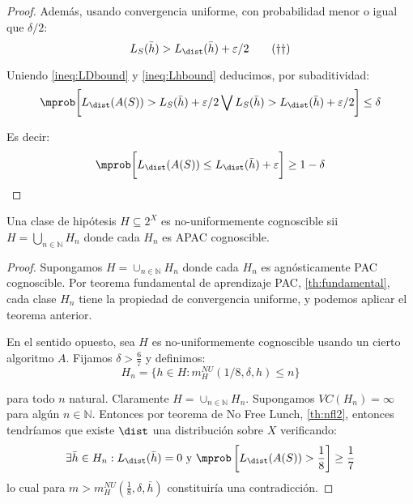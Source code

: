 \begin{proof}
   Además, usando convergencia uniforme, con probabilidad menor o igual que $\delta/2$:
   \begin{equation}
     L_S(\bar{h}) > L_{\dist}(\bar{h}) + \varepsilon/2
     \label{ineq:Lhbound}\tag{\textrm{$\dagger$$\dagger$}}
   \end{equation}

   Uniendo \eqref{ineq:LDbound} y \eqref{ineq:Lhbound} deducimos, por subaditividad:
   \[
     \mprob \bigg[L_{\dist}(A(S)) > L_{S}(\bar{h}) + \varepsilon/2 \bigvee L_S(\bar{h}) > L_{\dist}(\bar{h}) + \varepsilon/2\bigg] \le \delta
   \]
   
   Es decir:
   \[
     \mprob \bigg[L_{\dist}(A(S)) \le L_{\dist}(\bar{h}) + \varepsilon \bigg] \ge 1 - \delta
   \]
  \end{proof}

\begin{theorem}
Una clase de hipótesis $H \subseteq 2^X$ es no-uniformemente cognoscible sii $H = \bigcup_{n\in\mathbb{N}} H_n$ donde
cada $H_n$ es APAC cognoscible.
\end{theorem}
  \begin{proof}
   Supongamos $H = \cup_{n\in \mathbb{N}} H_n$ donde cada $H_n$ es agnósticamente PAC 
   cognoscible. Por teorema fundamental de aprendizaje PAC, \ref{th:fundamental}, cada clase $H_n$ tiene la propiedad de 
   convergencia uniforme, y podemos aplicar el teorema anterior.

   En el sentido opuesto, sea $H$ es no-uniformemente cognoscible usando un cierto algoritmo $A$. Fijamos $\delta > \frac{6}{7}$ y
   definimos:
   \[
     H_n = \{h \in H : m_{H}^{NU}(1/8, \delta, h) \le n\}
   \]
   
   para todo $n$ natural. Claramente $H = \cup_{n\in \mathbb{N}} H_n$. Supongamos $VC(H_n) = \infty$ para algún $n\in \mathbb{N}$.
   Entonces por teorema de No Free Lunch, \ref{th:nfl2}, entonces tendríamos que existe $\dist$ una distribución sobre 
   $X$ verificando:
   \[
     \exists \bar{h}\in H_n: L_{\dist}(\bar{h}) = 0 \textrm{ y } \mprob \left[ L_{\dist}(A(S)) > \frac{1}{8} \right] \ge \frac{1}{7}
   \]
   lo cual para $m > m_H^{NU}(\frac{1}{8}, \delta, \bar{h})$ constituiría una contradicción.
  \end{proof}
